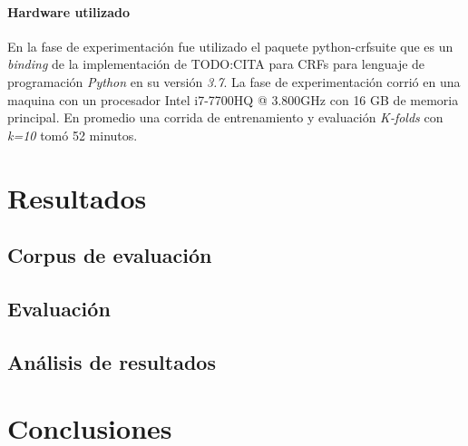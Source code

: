 \documentclass[letterpaper,12pt,oneside]{scrbook}
\theoremstyle{definition}
\begin{document}
	
	\subsubsection{Hardware utilizado}

	
	En la fase de experimentación fue utilizado el paquete \textsf{python-crfsuite} que es un \textit{binding} de la implementación de TODO:CITA para CRFs para lenguaje de programación \textit{Python} en su versión \textit{3.7}. La fase de experimentación corrió en una maquina con un procesador \textsf{Intel i7-7700HQ @ 3.800GHz} con \textsf{16 GB} de memoria principal. En promedio una corrida de entrenamiento y evaluación \textit{K-folds} con \textit{k=10} tomó 52 minutos.

	

	
	\chapter{Resultados}

	

	








	
	\section{Corpus de evaluación}

	
	\section{Evaluación}

	

	
	\section{Análisis de resultados}

	




	
	
	\chapter{Conclusiones}

	
	

	
\end{document}
